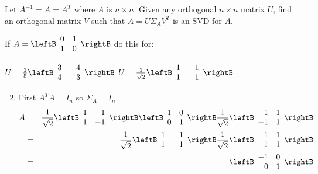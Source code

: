 \begin{multicols}{2}
\begin{ex}
Let $A^{-1}=A=A^{T}$ where $A$ is $n\times n$. Given any orthogonal $n\times n$ matrix $U$, find an orthogonal matrix $V$ such that $A=U\Sigma_{A}V^{T}$ is an SVD for $A$.

\noindent If $A=
\leftB 
\begin{array}{cc}
0 & 1 \\ 
1 & 0
\end{array}
\rightB $ do this for:
\begin{exenumerate}
\exitem $U=\frac{1}{5}
\leftB 
\begin{array}{rr}
3 & -4 \\ 
4 & 3
\end{array}
\rightB$
\exitem $U=\frac{1}{\sqrt{2}}
\leftB 
\begin{array}{rr}
1 & -1 \\ 
1 & 1
\end{array}
\rightB$
\end{exenumerate}
\begin{sol}
\begin{enumerate}[label={\alph*.}]
\setcounter{enumi}{1}
\item First $A^{T}A=I_{n}$ so $\Sigma _{A}=I_{n}$.  
\begin{eqnarray*}
A &=& \frac{1}{\sqrt{2}}\leftB
\begin{array}{rr}
1 & 1 \\ 
1 & -1
\end{array}
\rightB
\leftB
\begin{array}{rr}
1 & 0 \\ 
0 & 1
\end{array}
\rightB \frac{1}{\sqrt{2}}
\leftB 
\begin{array}{rr}
1 & 1 \\ 
-1 & 1
\end{array}
\rightB \\
& =&\frac{1}{\sqrt{2}}\leftB 
\begin{array}{rr}
1 & -1 \\ 
1 & 1
\end{array}
\rightB \frac{1}{\sqrt{2}}
\leftB 
\begin{array}{rr}
-1 & 1 \\ 
1 & 1
\end{array}
\rightB \\
& =& \leftB
\begin{array}{rr}
-1 & 0 \\ 
0 & 1
\end{array}
\rightB 
\end{eqnarray*}
\end{enumerate}
\end{sol}
\end{ex}


\end{multicols}
